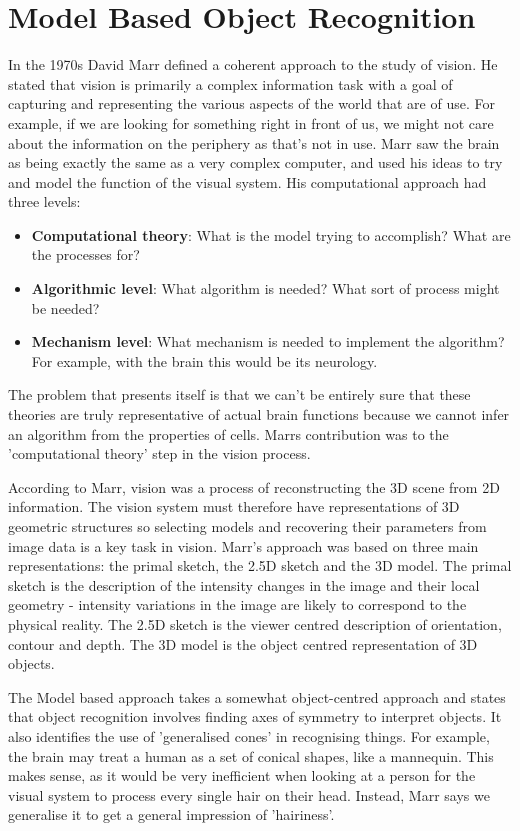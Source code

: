 \documentclass{article}
\begin{document}
	\section{Model Based Object Recognition}
	In the 1970s David Marr defined a coherent approach to the study of vision. He stated that vision is primarily a complex information task with a goal of capturing and representing the various aspects of the world that are of use. For example, if we are looking for something right in front of us, we might not care about the information on the periphery as that's not in use. Marr saw the brain as being exactly the same as a very complex computer, and used his ideas to try and model the function of the visual system. His computational approach had three levels:
	\begin{itemize}
		\item \textbf{Computational theory}: What is the model trying to accomplish? What are the processes for?
		\item \textbf{Algorithmic level}: What algorithm is needed? What sort of process might be needed?
		\item \textbf{Mechanism level}: What mechanism is needed to implement the algorithm? For example, with the brain this would be its neurology.
	\end{itemize}
	
	The problem that presents itself is that we can't be entirely sure that these theories are truly representative of actual brain functions because we cannot infer an algorithm from the properties of cells. Marrs contribution was to the 'computational theory' step in the vision process.
	
	\par 
	According to Marr, vision was a process of reconstructing the 3D scene from 2D information. The vision system must therefore have representations of 3D geometric structures so selecting models and recovering their parameters from image data is a key task in vision. Marr's approach was based on three main representations: the primal sketch, the 2.5D sketch and the 3D model. The primal sketch is the description of the intensity changes in the image and their local geometry - intensity variations in the image are likely to correspond to the physical reality. The 2.5D sketch is the viewer centred description of orientation, contour and depth. The 3D model is the object centred representation of 3D objects.
	
	\par 
	The Model based approach takes a somewhat object-centred approach and states that object recognition involves finding axes of symmetry to interpret objects. It also identifies the use of 'generalised cones' in recognising things. For example, the brain may treat a human as a set of conical shapes, like a mannequin. This makes sense, as it would be very inefficient when looking at a person for the visual system to process every single hair on their head. Instead, Marr says we generalise it to get a general impression of 'hairiness'.
	
\end{document}

